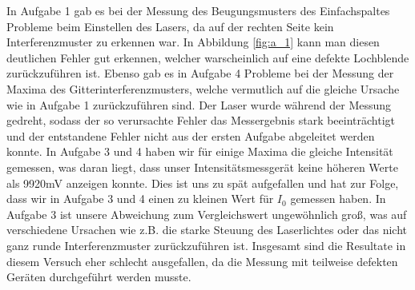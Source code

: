 \documentclass[12pt]{scrartcl}
\begin{document}
In Aufgabe 1 gab es bei der Messung des Beugungsmusters des Einfachspaltes Probleme beim Einstellen des Lasers, da auf der rechten Seite kein Interferenzmuster zu erkennen war.
In Abbildung \ref{fig:a_1} kann man diesen deutlichen Fehler gut erkennen, welcher warscheinlich auf eine defekte Lochblende zurückzuführen ist. Ebenso gab es in Aufgabe 4 Probleme bei der Messung der Maxima des Gitterinterferenzmusters, welche vermutlich auf die gleiche Ursache wie in Aufgabe 1 zurückzuführen sind. Der Laser wurde während der Messung gedreht, sodass der so verursachte Fehler das Messergebnis stark beeinträchtigt und der entstandene Fehler nicht aus der ersten Aufgabe abgeleitet werden konnte.
In Aufgabe 3 und 4 haben wir für einige Maxima die gleiche Intensität gemessen, was daran liegt, dass unser Intensitätsmessgerät keine höheren Werte als 9920mV anzeigen konnte. Dies ist uns zu spät aufgefallen und hat zur Folge, dass wir in Aufgabe 3 und 4 einen zu kleinen Wert für $I_0$ gemessen haben.
In Aufgabe 3 ist unsere Abweichung zum Vergleichswert ungewöhnlich groß, was auf verschiedene Ursachen wie z.B. die starke Steuung des Laserlichtes oder das nicht ganz runde Interferenzmuster zurückzuführen ist. Insgesamt sind die Resultate in diesem Versuch eher schlecht ausgefallen, da die Messung mit teilweise defekten Geräten durchgeführt werden musste.

\end{document}
